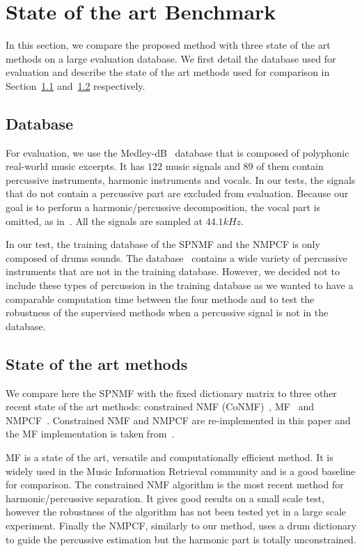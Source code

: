 \section{State of the art Benchmark}
\label{sec:stateoftheart}

In this section, we compare the proposed method with three state of the art methods on a large evaluation database. We first detail the database used for evaluation and describe the state of the art methods used for comparison in Section~\ref{database} and~\ref{soth} respectively.  


\subsection{Database}
\label{database}

For evaluation, we use the Medley-dB~\cite{bittner2014medleydb} database that is composed of polyphonic real-world music excerpts. It has $122$ music signals and $89$ of them contain percussive instruments, harmonic instruments and vocals. In our tests, the signals that do not contain a percussive part are excluded from evaluation. Because our goal is to perform a harmonic/percussive decomposition, the vocal part is omitted, as in~\cite{canadas2014percussive}. All the signals are sampled at $44.1kHz$.

In our test, the training database of the SPNMF and the NMPCF is only composed of drums sounds. The database~\cite{bittner2014medleydb} contains a wide variety of percussive instruments that are not in the training database. However, we decided not to include these types of percussion in the training database as we wanted to have a comparable computation time between the four methods and to test the robustness of the supervised methods when a percussive signal is not in the database. 


\subsection{State of the art methods}
\label{soth}

We compare here the SPNMF with the fixed dictionary matrix to three other recent state of the art methods: constrained NMF (CoNMF)~\cite{canadas2014percussive}, MF~\cite{fitzgerald2010harmonic} and NMPCF~\cite{kim2011nonnegative}. Constrained NMF and NMPCF are re-implemented in this paper and the MF implementation is taken from~\cite{DriedgerMueller14_TSMToolbox_DAFX}.

MF is a state of the art, versatile and computationally efficient method. It is widely used in the Music Information Retrieval community and is a good baseline for comparison. The constrained NMF algorithm is the most recent method for harmonic/percussive separation. It gives good results on a small scale test, however the robustness of the algorithm has not been tested yet in a large scale experiment. Finally the NMPCF, similarly to our method, uses a drum dictionary to guide the percussive estimation but the harmonic part is totally unconstrained. 


